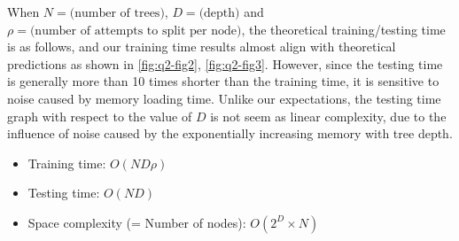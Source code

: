 \noindent
When $N = \text{(number of trees)}$, $D = \text{(depth)}$ and $\rho = \text{(number of attempts to split per node)}$, the theoretical training/testing time is as follows, and our training time results almost align with theoretical predictions as shown in \cref{fig:q2-fig2}, \cref{fig:q2-fig3}. However, since the testing time is generally more than 10 times shorter than the training time, it is sensitive to noise caused by memory loading time. Unlike our expectations, the testing time graph with respect to the value of $D$ is not seem as linear complexity, due to the influence of noise caused by the exponentially increasing memory with tree depth.

\begin{itemize}
	\item Training time: $O(ND\rho)$
	\item Testing time: $O(ND)$
	\item Space complexity (= Number of nodes): $O(2^{D} \times N)$
\end{itemize}

